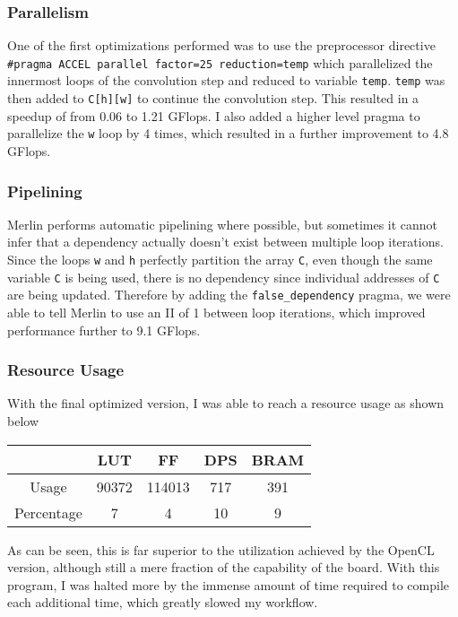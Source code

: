 \documentclass[letterpaper,twocolumn,10pt]{article}
\def\code#1{\texttt{#1}}
\begin{document}
\subsubsection{Parallelism}
One of the first optimizations performed was to use the preprocessor directive
\code{\#pragma ACCEL parallel factor=25 reduction=temp} which parallelized the
innermost loops of the convolution step and reduced to variable \code{temp}.
\code{temp} was then added to \code{C[h][w]} to continue the convolution step.
This resulted in a speedup of from 0.06 to 1.21 GFlops. I also added a higher
level pragma to parallelize the \code{w} loop by 4 times, which resulted in a
further improvement to 4.8 GFlops.
\subsubsection{Pipelining}
Merlin performs automatic pipelining where possible, but sometimes it cannot
infer that a dependency actually doesn't exist between multiple loop
iterations. Since the loops \code{w} and \code{h} perfectly partition the array
\code{C}, even though the same variable \code{C} is being used, there is no
dependency since individual addresses of \code{C} are being updated. Therefore
by adding the \code{false\_dependency} pragma, we were able to tell Merlin to
use an II of 1 between loop iterations, which improved performance further to
9.1 GFlops.
\subsubsection{Resource Usage}
With the final optimized version, I was able to reach a resource usage as shown
below
\begin{center}
    \begin{tabular}{|c|c|c|c|c|}
        \hline
        & LUT & FF & DPS & BRAM \\ \hline
        Usage & 90372 & 114013 & 717 & 391 \\ \hline
        Percentage & 7 & 4 & 10 & 9 \\ \hline        
    \end{tabular}
\end{center}
As can be seen, this is far superior to the utilization achieved by the OpenCL
version, although still a mere fraction of the capability of the board. With
this program, I was halted more by the immense amount of time required to
compile each additional time, which greatly slowed my workflow.
\end{document}
